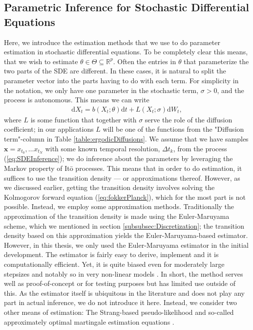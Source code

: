\subsection{Parametric Inference for Stochastic Differential Equations}
Here, we introduce the estimation methods that we use to do parameter estimation in stochastic differential equations. To be completely clear this means, that we wish to estimate $\theta\in\Theta\subseteq\mathbb{R}^p$. Often the entries in $\theta$ that parameterize the two parts of the SDE are different. In these cases, it is natural to split the parameter vector into the parts having to do with each term. For simplicity in the notation, we only have one parameter in the stochastic term, $\sigma>0$, and the process is autonomous. This means we can write
\begin{align}
    \mathrm{d}X_t = b(X_t; \theta)\mathrm{d}t + L\left(X_t; \sigma\right)\mathrm{d}W_t, \label{eq:SDEInference}
\end{align}
where $L$ is some function that together with $\sigma$ serve the role of the diffusion coefficient; in our applications $L$ will be one of the functions from the "Diffusion term"-column in Table \ref{table:ergodicDiffusions}. We assume that we have samples $\mathbf{x} = x_{t_0},\dots x_{t_N}$ with some known temporal resolution, $\Delta t_k$, from the process (\ref{eq:SDEInference}); we do inference about the parameters by leveraging the Markov property of Itō processes. This means that in order to do estimation, it suffices to use the transition density — or approximations thereof. However, as we discussed earlier, getting the transition density involves solving the Kolmogorov forward equation (\ref{eq:fokkerPlanck}), which for the most part is not possible. Instead, we employ some approximation methods.
Traditionally the approximation of the transition density is made using the Euler-Maruyama scheme, which we mentioned in section \ref{subsubsec:Discretization}; the transition density based on this approximation yields the Euler-Maruyama-based estimator. However, in this thesis, we only used the Euler-Maruyama estimator in the initial development. The estimator is fairly easy to derive, implement and it is computationally efficient. Yet, it is quite biased even for moderately large stepsizes and notably so in very non-linear models \cite{SplittingSchemes}. In short, the method serves well as proof-of-concept or for testing purposes but has limited use outside of this. As the estimator itself is ubiquitous in the literature and does not play any part in actual inference, we do not introduce it here. Instead, we consider two other means of estimation: The Strang-based pseudo-likelihood \cite{SplittingSchemes} and so-called approximately optimal martingale estimation equations \cite{StatisticalMethodsForSDE}.
